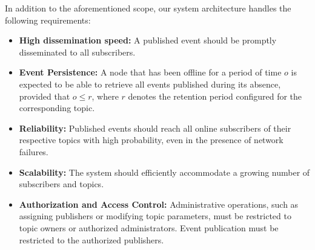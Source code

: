 In addition to the aforementioned scope, our system architecture handles the following requirements:
\begin{itemize}
    \item \textbf{High dissemination speed: }A published event should be promptly disseminated to all subscribers.
    \item \textbf{Event Persistence: }A node that has been offline for a period of time $o$ is expected to be able to retrieve 
    all events published during its absence, provided that $o \leq r$, where $r$ denotes the retention period configured for the corresponding topic.
    \item \textbf{Reliability: }Published events should reach all online subscribers of their respective topics with high probability, even in the presence of network failures.
    \item \textbf{Scalability: }The system should efficiently accommodate a growing number of subscribers and topics.
    \item \textbf{Authorization and Access Control: }Administrative operations, such as assigning publishers or modifying topic parameters, must be restricted to topic owners
    or authorized administrators.
    Event publication must be restricted to the authorized publishers.
\end{itemize}
